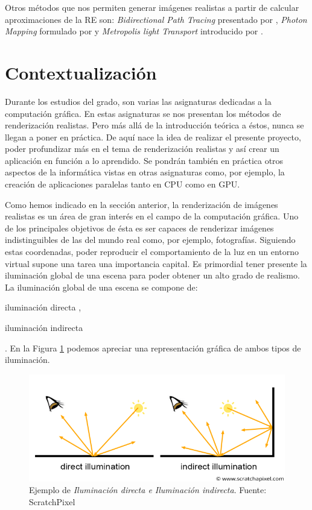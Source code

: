 \documentclass[titlepage,12pt]{article}
\begin{document}
Otros métodos que nos permiten generar imágenes realistas a partir de calcular aproximaciones de la RE son: \textit{Bidirectional Path Tracing} presentado por \citep{Lafortune1993}, \textit{Photon Mapping} formulado por \citep{Jensen1996} y \textit{Metropolis light Transport} introducido por \citep{Veach1997}.


\section{Contextualización}

Durante los estudios del grado, son varias las asignaturas dedicadas a la computación gráfica. En estas asignaturas se nos presentan los métodos de renderización realistas. Pero más allá de la introducción teórica a éstos, nunca se llegan a poner en práctica. De aquí nace la idea de realizar el presente proyecto, poder profundizar más en el tema de renderización realistas y así crear un aplicación en función a lo aprendido. Se pondrán también en práctica otros aspectos de la informática vistas en otras asignaturas como, por ejemplo, la creación de aplicaciones paralelas tanto en CPU como en GPU.

Como hemos indicado en la sección anterior, la renderización de imágenes realistas es un área de gran interés en el campo de la computación gráfica. Uno de los principales objetivos de ésta es ser capaces de renderizar imágenes indistinguibles de las del mundo real como, por ejemplo, fotografías. Siguiendo estas coordenadas, poder reproducir el comportamiento de la luz en un entorno virtual supone una tarea una importancia capital. Es primordial tener presente la iluminación global de una escena para poder obtener un alto grado de realismo. La iluminación global de una escena se compone de: \begin{enumerate*}[label=\roman*)] \item iluminación directa \label{item:dl}, \item iluminación indirecta \label{item:il} \end{enumerate*}. En la Figura \ref{globalil} podemos apreciar una representación gráfica de ambos tipos de iluminación.

\begin{figure}[!ht]
	\centering
	\includegraphics[scale=0.45]{media/shad2-globalillum3.png}
	\caption{Ejemplo de \textit{Iluminación directa e Iluminación indirecta}. Fuente: ScratchPixel}
	\label{globalil}
\end{figure}
\end{document}
